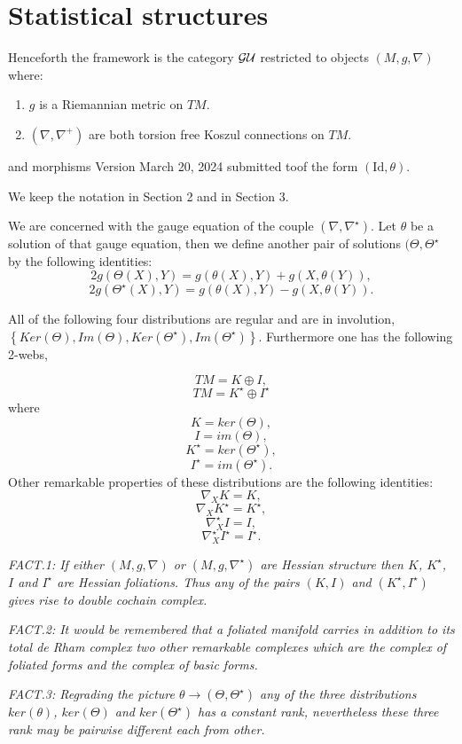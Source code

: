 \section{Statistical structures}
Henceforth the framework is the category $\mathcal{GU}$ restricted to objects $(M,g,\nabla)$ where:
\begin{enumerate}[label=(\roman*)]
    \item  $g$ is a Riemannian metric on $TM.$
    \item  $(\nabla,\nabla^+)$ are both torsion free Koszul connections on $TM$.
\end{enumerate}
and morphisms Version March 20, 2024 submitted toof the form $(\text{Id}, \theta).$

We keep the notation in Section 2 and in Section 3.

We are concerned with the gauge equation of the couple $(\nabla,\nabla^\star)$. Let $\theta$ be a solution of that gauge equation, then we define another pair of solutions $(\Theta,\Theta^\star$ by the following identities:
$$2g(\Theta(X),Y) = g(\theta(X), Y) + g(X, \theta(Y)),$$
$$2g(\Theta^\star(X),Y) = g(\theta(X), Y) - g(X, \theta(Y)).$$

All of the following four distributions are regular and are 
in involution,\\
$\left\{Ker(\Theta),Im(\Theta), Ker(\Theta^\star), Im(\Theta^\star)\right\}.$ Furthermore one has the following 2-webs,

$$TM = K \oplus I,$$ 
$$TM = K^\star \oplus I^\star$$ 
where
$$K = ker(\Theta),$$
$$I = im(\Theta),$$
$$K^\star = ker(\Theta^\star),$$
$$I^\star = im(\Theta^\star).$$
Other remarkable properties of these distributions are the following identities:
$$\nabla_XK = K,$$
$$\nabla_XK^\star = K^\star,$$
$$\nabla^\star_XI = I,$$
$$\nabla^\star_XI^\star = I^\star.$$

\textit{FACT.1: If either $(M, g,\nabla)$ or $(M, g, \nabla^\star)$ are Hessian structure then $K$, $K^\star$, $I$ and $I^\star$ are Hessian foliations. Thus any of the pairs $(K,I)$ and $(K^\star,I^\star)$ gives rise to double cochain complex.} 

\textit{FACT.2: It would be remembered that a foliated manifold carries in addition to its total de Rham complex two other remarkable complexes which are the complex of foliated forms and the complex of basic forms.}

\textit{FACT.3: Regrading the picture $\theta\rightarrow (\Theta, \Theta^\star)$ any of the three distributions $ker(\theta)$, $ker(\Theta)$ and $ker(\Theta^\star)$ has a constant rank, nevertheless these three rank may be pairwise different each from other.}

